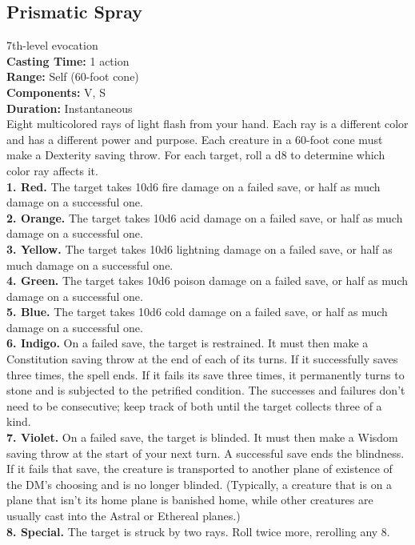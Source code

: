 \documentclass[11pt, A4paper, english]{article}
\begin{document}
		\subsection{Prismatic Spray}
7th-level evocation \\
\textbf{Casting Time:} 1 action \\
\textbf{Range:} Self (60-foot cone) \\
\textbf{Components:} V, S \\
\textbf{Duration:} Instantaneous \\
Eight multicolored rays of light flash from your hand. Each ray is a different color and has a different power and purpose. Each creature in a 60-foot cone must make a Dexterity saving throw. For each target, roll a d8 to determine which color ray affects it. \\
\textbf{1. Red.} The target takes 10d6 fire damage on a failed save, or half as much damage on a successful one. \\
\textbf{2. Orange.} The target takes 10d6 acid damage on a failed save, or half as much damage on a successful one. \\
\textbf{3. Yellow.} The target takes 10d6 lightning damage on a failed save, or half as much damage on a successful one. \\
\textbf{4. Green.} The target takes 10d6 poison damage on a failed save, or half as much damage on a successful one. \\
\textbf{5. Blue.} The target takes 10d6 cold damage on a failed save, or half as much damage on a successful one. \\
\textbf{6. Indigo.} On a failed save, the target is restrained. It must then make a Constitution saving throw at the end of each of its turns. If it successfully saves three times, the spell ends. If it fails its save three times, it permanently turns to stone and is subjected to the petrified condition. The successes and failures don’t need to be consecutive; keep track of both until the target collects three of a kind. \\
\textbf{7. Violet.} On a failed save, the target is blinded. It must then make a Wisdom saving throw at the start of your next turn. A successful save ends the blindness. If it fails that save, the creature is transported to another plane of existence of the DM’s choosing and is no longer blinded. (Typically, a creature that is on a plane that isn’t its home plane is banished home, while other creatures are usually cast into the Astral or Ethereal planes.) \\
\textbf{8. Special.} The target is struck by two rays. Roll twice more, rerolling any 8.
\end{document}
